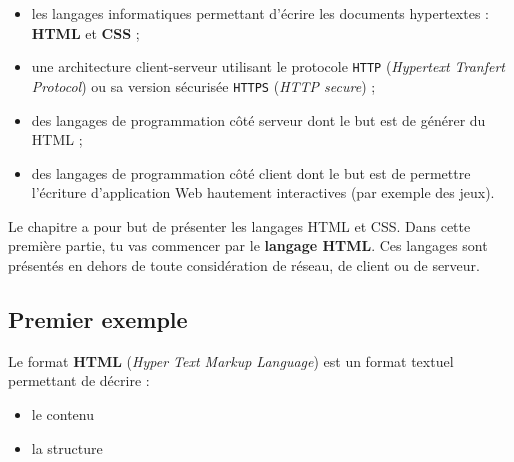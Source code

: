 \documentclass[a4paper,17pt]{extarticle}
\providecommand{\tightlist}{%
      \setlength{\itemsep}{0pt}\setlength{\parskip}{0pt}}
\begin{document}
\begin{itemize}
\tightlist
\item
  les langages informatiques permettant d'écrire les documents
  hypertextes : \textbf{HTML} et \textbf{CSS} ;
\item
  une architecture client-serveur utilisant le protocole \texttt{HTTP}
  (\emph{Hypertext Tranfert Protocol}) ou sa version sécurisée
  \texttt{HTTPS} (\emph{HTTP secure}) ;
\item
  des langages de programmation côté serveur dont le but est de générer
  du HTML ;
\item
  des langages de programmation côté client dont le but est de permettre
  l'écriture d'application Web hautement interactives (par exemple des
  jeux).
\end{itemize}
\begin{remarque}
    Le chapitre a pour but de présenter les langages HTML et CSS. Dans cette
première partie, tu vas commencer par le \textbf{langage HTML}. Ces
langages sont présentés en dehors de toute considération de réseau, de
client ou de serveur.

            \end{remarque}
    \hypertarget{premier-exemple}{%
\subsection{Premier exemple}\label{premier-exemple}}

    Le format \textbf{HTML} (\emph{Hyper Text Markup Language}) est un
format textuel permettant de décrire :

\begin{itemize}
\tightlist
\item
  le contenu
\item
  la structure
\end{itemize}
\end{document}
